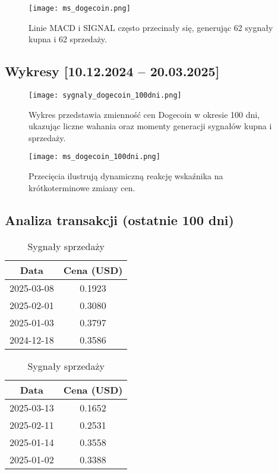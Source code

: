 \documentclass[a4paper,12pt]{article}
\begin{document}
\begin{figure}[H]
  \centering
  \texttt{[image: ms\_dogecoin.png]}
  \par\vspace{0.5em}
  \parbox{0.9\textwidth}{\centering\small Linie MACD i SIGNAL często przecinały się, generując 62 sygnały kupna i 62 sprzedaży. }
\end{figure}

\subsection{Wykresy [10.12.2024 – 20.03.2025]}

\begin{figure}[H]
  \centering
  \texttt{[image: sygnaly\_dogecoin\_100dni.png]}
  \par\vspace{0.5em}
  \parbox{0.9\textwidth}{\centering\small Wykres przedstawia zmienność cen Dogecoin w okresie 100 dni, ukazując liczne wahania oraz momenty generacji sygnałów kupna i sprzedaży. }
\end{figure}

\begin{figure}[H]
  \centering
  \texttt{[image: ms\_dogecoin\_100dni.png]}
  \par\vspace{0.5em}
  \parbox{0.9\textwidth}{\centering\small Przecięcia ilustrują dynamiczną reakcję wskaźnika na krótkoterminowe zmiany cen.}
\end{figure}


\subsection{Analiza transakcji (ostatnie 100 dni)}

\begin{table}[H]
\centering
\begin{minipage}{0.48\textwidth}
\centering
\caption{Sygnały kupna}
\begin{tabular}{|c|c|}
\hline
\textbf{Data} & \textbf{Cena (USD)} \\
\hline
2025-03-08 & 0.1923 \\
2025-02-01 & 0.3080 \\
2025-01-03 & 0.3797 \\
2024-12-18 & 0.3586 \\
\hline
\end{tabular}
\end{minipage}
\hfill
\begin{minipage}{0.48\textwidth}
\centering
\caption{Sygnały sprzedaży}
\begin{tabular}{|c|c|}
\hline
\textbf{Data} & \textbf{Cena (USD)} \\
\hline
2025-03-13 & 0.1652 \\
2025-02-11 & 0.2531 \\
2025-01-14 & 0.3558 \\
2025-01-02 & 0.3388 \\
\hline
\end{tabular}
\end{minipage}
\end{table}
\end{document}
